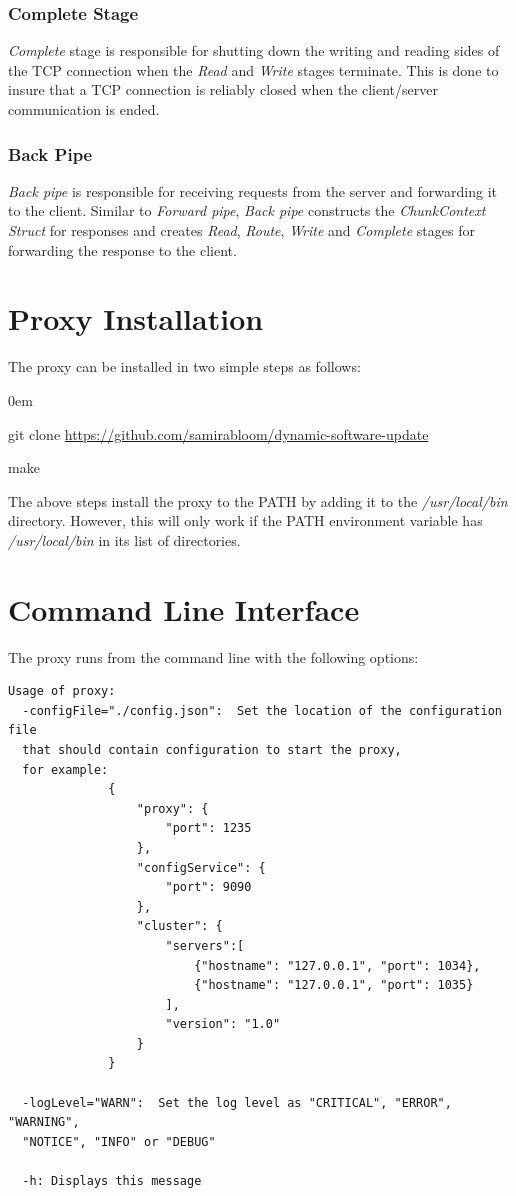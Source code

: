 \documentclass[a4paper,11pt,twoside]{report}
\begin{document}
\subsubsection*{Complete Stage}
\textit{Complete} stage is responsible for shutting down the writing and reading sides of the TCP connection when the \textit{Read} and \textit{Write} stages terminate. This is done to insure that a TCP connection is reliably closed when the client/server communication is ended. 

\subsubsection*{Back Pipe}
\textit{Back pipe} is responsible for receiving requests from the server and forwarding it to the client. Similar to \textit{Forward pipe}, \textit{Back pipe} constructs the \textit{ChunkContext Struct} for responses and creates \textit{Read}, \textit{Route}, \textit{Write} and \textit{Complete} stages for forwarding the response to the client.

\section{Proxy Installation}
The proxy can be installed in two simple steps as follows:
\begin{list}{-}{}
  \itemsep0em
  \item git clone \url {https://github.com/samirabloom/dynamic-software-update} 
  \item make
\end{list}

\noindent
The above steps install the proxy to the PATH by adding it to the \textit{/usr/local/bin} directory. However, this will only work if the PATH environment variable has \textit{/usr/local/bin} in its list of directories. 

\section{Command Line Interface}
The proxy runs from the command line with the following options:\bigskip

\begin{lstlisting}[language=terminal]
Usage of proxy:
  -configFile="./config.json":  Set the location of the configuration file 
  that should contain configuration to start the proxy, 
  for example:
              {
                  "proxy": {
                      "port": 1235
                  },
                  "configService": {
                      "port": 9090
                  },
                  "cluster": {
                      "servers":[
                          {"hostname": "127.0.0.1", "port": 1034},
                          {"hostname": "127.0.0.1", "port": 1035}
                      ],
                      "version": "1.0"
                  }
              }

  -logLevel="WARN":  Set the log level as "CRITICAL", "ERROR", "WARNING", 
  "NOTICE", "INFO" or "DEBUG"

  -h: Displays this message
\end{lstlisting} 
\end{document}
